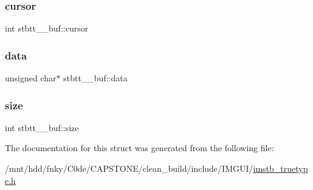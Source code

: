 \subsubsection{\texorpdfstring{cursor}{cursor}}
{\footnotesize\ttfamily int stbtt\+\_\+\+\_\+buf\+::cursor}

\mbox{\label{structstbtt____buf_a376d8cdacbc8295a7e88567ad52a0ac4}} 
\subsubsection{\texorpdfstring{data}{data}}
{\footnotesize\ttfamily unsigned char$\ast$ stbtt\+\_\+\+\_\+buf\+::data}

\mbox{\label{structstbtt____buf_a0f6f2d06981ab4a5697233bbd0cafb5b}} 
\subsubsection{\texorpdfstring{size}{size}}
{\footnotesize\ttfamily int stbtt\+\_\+\+\_\+buf\+::size}



The documentation for this struct was generated from the following file\+:\begin{DoxyCompactItemize}
\item 
/mnt/hdd/fnky/\+C0de/\+C\+A\+P\+S\+T\+O\+N\+E/clean\+\_\+build/include/\+I\+M\+G\+U\+I/\hyperlink{imstb__truetype_8h}{imstb\+\_\+truetype.\+h}\end{DoxyCompactItemize}
